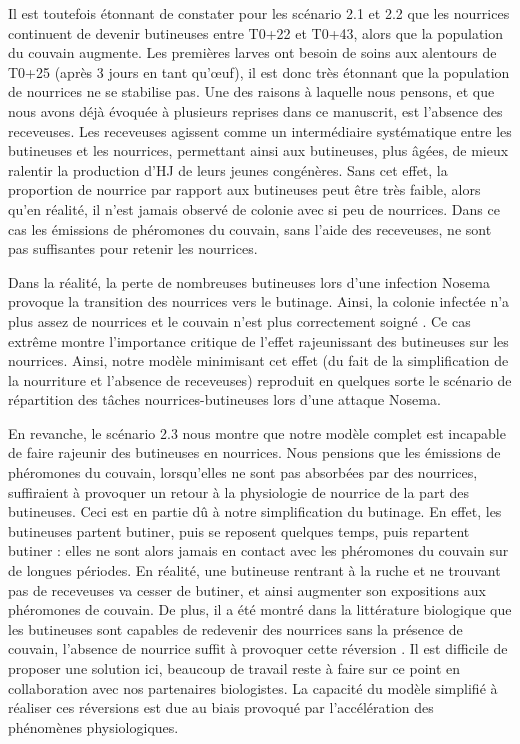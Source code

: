 		Il est toutefois étonnant de constater pour les scénario 2.1 et 2.2 que les nourrices continuent de devenir butineuses entre T0+22 et T0+43, alors que la population du couvain augmente. Les premières larves ont besoin de soins aux alentours de T0+25 (après 3 jours en tant qu'œuf), il est donc très étonnant que la population de nourrices ne se stabilise pas. Une des raisons à laquelle nous pensons, et que nous avons déjà évoquée à plusieurs reprises dans ce manuscrit, est l'absence des receveuses. Les receveuses agissent comme un intermédiaire systématique entre les butineuses et les nourrices, permettant ainsi aux butineuses, plus âgées, de mieux ralentir la production d'HJ de leurs jeunes congénères. Sans cet effet, la proportion de nourrice par rapport aux butineuses peut être très faible, alors qu'en réalité, il n'est jamais observé de colonie avec si peu de nourrices. Dans ce cas les émissions de phéromones du couvain, sans l'aide des receveuses, ne sont pas suffisantes pour retenir les nourrices.
		
		 Dans la réalité, la perte de nombreuses butineuses lors d'une infection Nosema provoque la transition des nourrices vers le butinage. Ainsi, la colonie infectée n'a plus assez de nourrices et le couvain n'est plus correctement soigné \cite{hassanein_influence_1953, higes_how_2008}. Ce cas extrême montre l'importance critique de l'effet rajeunissant des butineuses sur les nourrices. Ainsi, notre modèle minimisant cet effet (du fait de la simplification de la nourriture et l'absence de receveuses) reproduit en quelques sorte le scénario de répartition des tâches nourrices-butineuses lors d'une attaque Nosema.	
		 
		 En revanche, le scénario 2.3 nous montre que notre modèle complet est incapable de faire rajeunir des butineuses en nourrices. Nous pensions que les émissions de phéromones du couvain, lorsqu'elles ne sont pas absorbées par des nourrices, suffiraient à provoquer un retour à la physiologie de nourrice de la part des butineuses. Ceci est en partie dû à notre simplification du butinage. En effet, les butineuses partent butiner, puis se reposent quelques temps, puis repartent butiner : elles ne sont alors jamais en contact avec les phéromones du couvain sur de longues périodes. En réalité, une butineuse rentrant à la ruche et ne trouvant pas de receveuses va cesser de butiner, et ainsi augmenter son expositions aux phéromones de couvain. De plus, il a été montré dans la littérature biologique que les butineuses sont capables de redevenir des nourrices sans la présence de couvain, l'absence de nourrice suffit à provoquer cette réversion \cite{huang_regulation_1996}. Il est difficile de proposer une solution ici, beaucoup de travail reste à faire sur ce point en collaboration avec nos partenaires biologistes.
		 La capacité du modèle simplifié à réaliser ces réversions est due au biais provoqué par l'accélération des phénomènes physiologiques.
		
